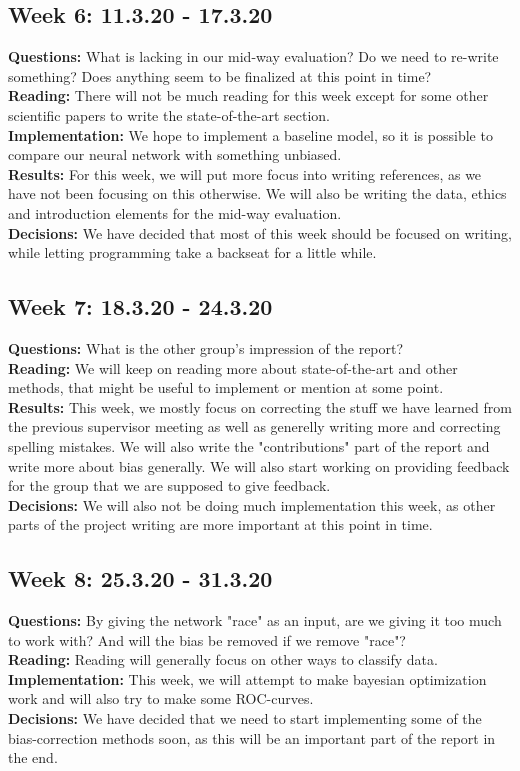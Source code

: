 \documentclass[11pt, fleqn]{article}
\begin{document}
\subsection*{Week 6: 11.3.20 - 17.3.20}
\textbf{Questions:} What is lacking in our mid-way evaluation? Do we need to re-write something? Does anything seem to be finalized at this point in time? \\
\textbf{Reading:} There will not be much reading for this week except for some other scientific papers to write the state-of-the-art section. \\
\textbf{Implementation:} We hope to implement a baseline model, so it is possible to compare our neural network with something unbiased. \\
\textbf{Results:} For this week, we will put more focus into writing references, as we have not been focusing on this otherwise. We will also be writing the data, ethics and introduction elements for the mid-way evaluation. \\
\textbf{Decisions:} We have decided that most of this week should be focused on writing, while letting programming take a backseat for a little while.

\subsection*{Week 7: 18.3.20 - 24.3.20}
\textbf{Questions:} What is the other group's impression of the report? \\
\textbf{Reading:} We will keep on reading more about state-of-the-art and other methods, that might be useful to implement or mention at some point. \\
\textbf{Results:} This week, we mostly focus on correcting the stuff we have learned from the previous supervisor meeting as well as generelly writing more and correcting spelling mistakes. We will also write the "contributions" part of the report and write more about bias generally. We will also start working on providing feedback for the group that we are supposed to give feedback. \\
\textbf{Decisions:} We will also not be doing much implementation this week, as other parts of the project writing are more important at this point in time.

\subsection*{Week 8: 25.3.20 - 31.3.20}
\textbf{Questions:} By giving the network "race" as an input, are we giving it too much to work with? And will the bias be removed if we remove "race"? \\
\textbf{Reading:} Reading will generally focus on other ways to classify data. \\
\textbf{Implementation:} This week, we will attempt to make bayesian optimization work and will also try to make some ROC-curves. \\
\textbf{Decisions:} We have decided that we need to start implementing some of the bias-correction methods soon, as this will be an important part of the report in the end.
\end{document}
